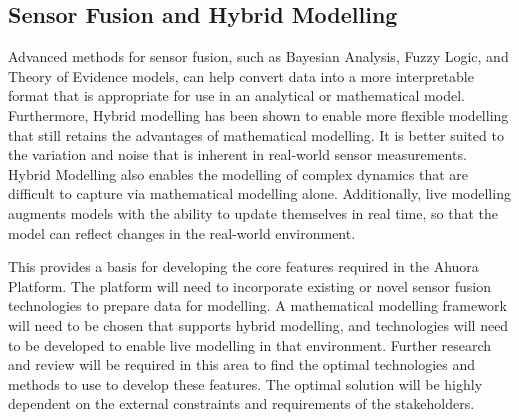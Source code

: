 \subsection{Sensor Fusion and Hybrid Modelling}

Advanced methods for sensor fusion, such as Bayesian Analysis, Fuzzy Logic, and Theory of Evidence models, can help convert data into a more interpretable format that is appropriate for use in an analytical or mathematical model. 
Furthermore, Hybrid modelling has been shown to enable more flexible modelling that still retains the advantages of mathematical modelling. 
It is better suited to the variation and noise that is inherent in real-world sensor measurements. 
Hybrid Modelling also enables the modelling of complex dynamics that are difficult to capture via mathematical modelling alone. 
Additionally, live modelling augments models with the ability to update themselves in real time, so that the model can reflect changes in the real-world environment.


This provides a basis for developing the core features required in the Ahuora Platform. The platform will need to incorporate existing or novel sensor fusion technologies to prepare data for modelling. 
A mathematical modelling framework will need to be chosen that supports hybrid modelling, and technologies will need to be developed to enable live modelling in that environment. 
Further research and review will be required in this area to find the optimal technologies and methods to use to develop these features. The optimal solution will be highly dependent on the external constraints and requirements of the stakeholders.

